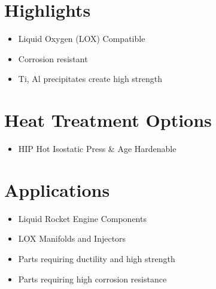 \documentclass[10pt]{article}
\begin{document}
\section*{Highlights}
\begin{itemize}
  \item Liquid Oxygen (LOX) Compatible

  \item Corrosion resistant

  \item Ti, Al precipitates create high strength

\end{itemize}

\section*{Heat Treatment Options}
\begin{itemize}
  \item HIP Hot Isostatic Press \& Age Hardenable
\end{itemize}

\section*{Applications}
\begin{itemize}
  \item Liquid Rocket Engine Components

  \item LOX Manifolds and Injectors

  \item Parts requiring ductility and high strength

  \item Parts requiring high corrosion resistance

\end{itemize}
\end{document}
